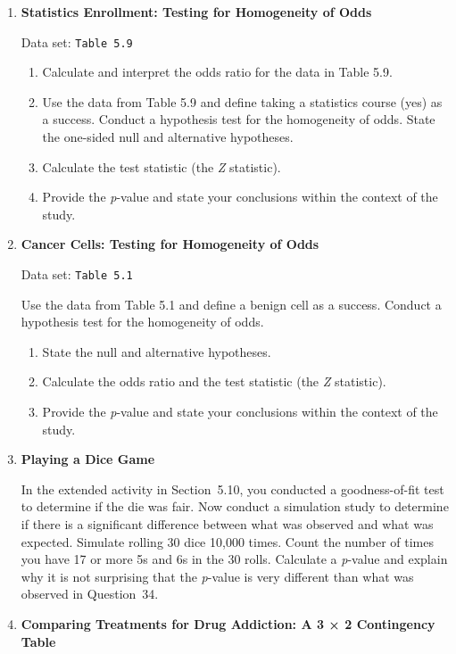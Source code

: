 \documentclass[
]{report}
\begin{document}
\begin{enumerate}
  \item \textbf{Statistics Enrollment: Testing for Homogeneity of Odds}    

  Data set: \texttt{Table 5.9}   
  
  \begin{enumerate}
    \item Calculate and interpret the odds ratio for the data in Table 5.9.
    \item Use the data from Table 5.9 and define taking a statistics course (yes) as a success. Conduct a hypothesis test for the homogeneity of odds. State the one-sided null and alternative hypotheses.
    \item Calculate the test statistic (the \textit{Z} statistic).
    \item Provide the \textit{p}-value and state your conclusions within the context of the study.
  \end{enumerate}

  \item \textbf{Cancer Cells: Testing for Homogeneity of Odds}    

  Data set: \texttt{Table 5.1}    
  
  Use the data from Table 5.1 and define a benign cell as a success. Conduct a hypothesis test for the homogeneity of odds.  
  \begin{enumerate}
    \item State the null and alternative hypotheses.
    \item Calculate the odds ratio and the test statistic (the \textit{Z} statistic).
    \item Provide the \textit{p}-value and state your conclusions within the context of the study.
  \end{enumerate}

  \item \textbf{Playing a Dice Game}    

  In the extended activity in Section 5.10, you conducted a goodness-of-fit test to determine if the die was fair. Now conduct a simulation study to determine if there is a significant difference between what was observed and what was expected. Simulate rolling 30 dice 10,000 times. Count the number of times you have 17 or more 5s and 6s in the 30 rolls. Calculate a \textit{p}-value and explain why it is not surprising that the \textit{p}-value is very different than what was observed in Question 34.

  \item \textbf{Comparing Treatments for Drug Addiction: A 3 × 2 Contingency Table}    


\end{enumerate}
\end{document}
